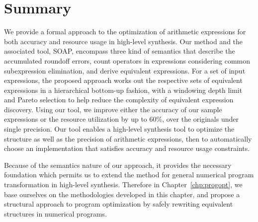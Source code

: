 \section{Summary}
\label{so:sec:conclusion}

We provide a formal approach to the optimization of arithmetic expressions
for both accuracy and resource usage in high-level synthesis. Our method and
the associated tool, SOAP, encompass three kind of semantics that describe
the accumulated roundoff errors, count operators in expressions considering
common subexpression elimination, and derive equivalent expressions. For a
set of input expressions, the proposed approach works out the respective
sets of equivalent expressions in a hierarchical bottom-up fashion, with a
windowing depth limit and Pareto selection to help reduce the complexity of
equivalent expression discovery. Using our tool, we improve either the accuracy
of our sample expressions or the resource utilization by up to 60\%, over the
originals under single precision. Our tool enables a high-level synthesis tool
to optimize the structure as well as the precision of arithmetic expressions,
then to automatically choose an implementation that satisfies accuracy and
resource usage constraints.

Because of the semantics nature of our approach, it provides the necessary
foundation which permits us to extend the method for general numerical program
transformation in high-level synthesis. Therefore in Chapter~\ref{chp:progopt},
we base ourselves on the methodologies developed in this chapter, and propose
a structural approach to program optimization by safely rewriting equivalent
structures in numerical programs.

